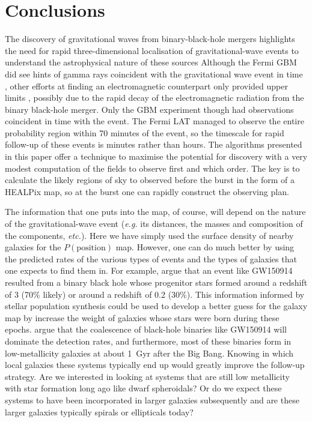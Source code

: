 \documentclass[useAMS,usenatbib]{mn2e}
\begin{document}
\section{Conclusions}

The discovery of gravitational waves from binary-black-hole mergers
highlights the need for rapid three-dimensional localisation of
gravitational-wave events to understand the astrophysical nature of
these sources
\citep{2013ApJ...767..124N,2016arXiv160307333S,2016arXiv160504242S}
Although the Fermi GBM did see hints of gamma rays coincident with the
gravitational wave event in time \citep{2016arXiv160203920C}, other
efforts at finding an electromagnetic counterpart only provided upper
limits
\citep[e.g][]{2016arXiv160208492A,2016arXiv160204198S,2016arXiv160204156S,2016arXiv160204488F},
possibly due to the rapid decay of the electromagnetic radiation from
the binary black-hole merger.  Only the GBM experiment though had
observations coincident in time with the event.  The Fermi LAT managed
to observe the entire probability region within 70 minutes of the
event, so the timescale for rapid follow-up of these events is minutes
rather than hours.  The algorithms presented in this paper offer a
technique to maximise the potential for discovery with a very modest
computation of the fields to observe first and which order.  The key
is to calculate the likely regions of sky to observed before the burst
in the form of a HEALPix map, so at the burst one can rapidly
construct the observing plan.

The information that one puts into the map, of course, will depend on
the nature of the gravitational-wave event ({\em e.g.} its distances,
the masses and composition of the components, {\em etc.}).  Here we
have simply used the surface density of nearby galaxies for the
$P(\mathrm{position})$ map.  However, one can do much better by using
the predicted rates of the various types of events and the types of
galaxies that one expects to find them in.  For example,
\citet{2016arXiv160204531B} argue that an event like GW150914 resulted
from a binary black hole whose progenitor stars formed around a
redshift of 3 (70\% likely) or around a redshift of 0.2 (30\%).  This
information informed by stellar population synthesis could be used to
develop a better guess for the galaxy map by increase the weight of
galaxies whose stars were born during these epochs.
\citet{2015ApJ...806..263D} argue that the coalescence of black-hole
binaries like GW150914 will dominate the detection rates, and
furthermore, most of these binaries form in low-metallicity galaxies
at about 1~Gyr after the Big Bang.  Knowing in which local galaxies
these systems typically end up would greatly improve the follow-up
strategy.  Are we interested in looking at systems that are still low
metallicity with star formation long ago like dwarf spheroidals?  Or
do we expect these systems to have been incorporated in larger
galaxies subsequently and are these larger galaxies typically spirals
or ellipticals today?
\end{document}
